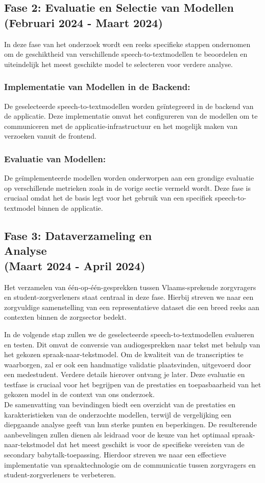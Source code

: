 \subsection{Fase 2: Evaluatie en Selectie van Modellen \\ (Februari 2024 - Maart 2024)}
In deze fase van het onderzoek wordt een reeks specifieke stappen ondernomen om de geschiktheid van verschillende speech-to-textmodellen te beoordelen en uiteindelijk het meest geschikte model te selecteren voor verdere analyse.
\subsubsection{Implementatie van Modellen in de Backend:}
De geselecteerde speech-to-textmodellen worden geïntegreerd in de backend van de applicatie. Deze implementatie omvat het configureren van de modellen om te communiceren met de applicatie-infrastructuur en het mogelijk maken van verzoeken vanuit de frontend.

\subsubsection{Evaluatie van Modellen:}
De geïmplementeerde modellen worden onderworpen aan een grondige evaluatie op verschillende metrieken zoals in de vorige sectie vermeld wordt.
Deze fase is cruciaal omdat het de basis legt voor het gebruik van een specifiek speech-to-textmodel binnen de applicatie.

\subsection{Fase 3: Dataverzameling en \\ Analyse \\ (Maart 2024 - April 2024)}
Het verzamelen van één-op-één-gesprekken tussen Vlaams-sprekende zorgvragers en student-zorgverleners staat centraal in deze fase. Hierbij streven we naar een zorgvuldige samenstelling van een representatieve dataset die een breed reeks aan contexten binnen de zorgsector bedekt.

In de volgende stap zullen we de geselecteerde speech-to-textmodellen evalueren en testen. Dit omvat de conversie van audiogesprekken naar tekst met behulp van het gekozen spraak-naar-tekstmodel. Om de kwaliteit van de transcripties te waarborgen, zal er ook een handmatige validatie plaatsvinden, uitgevoerd door een medestudent. Verdere details hierover ontvang je later. Deze evaluatie en testfase is cruciaal voor het begrijpen van de prestaties en toepasbaarheid van het gekozen model in de context van ons onderzoek.\\
De samenvatting van bevindingen biedt een overzicht van de prestaties en karakteristieken van de onderzochte modellen, terwijl de vergelijking een diepgaande analyse geeft van hun sterke punten en beperkingen. De resulterende aanbevelingen zullen dienen als leidraad voor de keuze van het optimaal spraak-naar-tekstmodel dat het meest geschikt is voor de specifieke vereisten van de secondary babytalk-toepassing. Hierdoor streven we naar een effectieve implementatie van spraaktechnologie om de communicatie tussen zorgvragers en student-zorgverleners te verbeteren.
